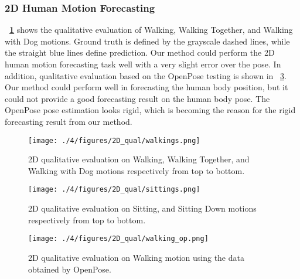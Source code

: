 \subsubsection{2D Human Motion Forecasting}\label{4:qual_2D}
\textbf{\figurename~\ref{fig:4_2d_long_walkings}} shows the qualitative evaluation of Walking, Walking Together, and Walking with Dog motions. Ground truth is defined by the grayscale dashed lines, while the straight blue lines define prediction. Our method could perform the 2D human motion forecasting task well with a very slight error over the pose. In addition, qualitative evaluation based on the OpenPose testing is shown in \figurename~\ref{fig:4_2d_long_walking_op}. Our method could perform well in forecasting the human body position, but it could not provide a good forecasting result on the human body pose. The OpenPose pose estimation looks rigid, which is becoming the reason for the rigid forecasting result from our method.
\begin{figure}[!t]
     \centering
     \texttt{[image: ./4/figures/2D\_qual/walkings.png]}
     \caption{2D qualitative evaluation on Walking, Walking Together, and Walking with Dog motions respectively from top to bottom.}
     \label{fig:4_2d_long_walkings}
\end{figure}
\begin{figure}[!t]
     \centering
     \texttt{[image: ./4/figures/2D\_qual/sittings.png]}
     \caption{2D qualitative evaluation on Sitting, and Sitting Down motions respectively from top to bottom.}
     \label{fig:4_2d_long_sittings}
\end{figure}
\begin{figure}[!t]
     \centering
     \texttt{[image: ./4/figures/2D\_qual/walking\_op.png]}
     \caption{2D qualitative evaluation on Walking motion using the data obtained by OpenPose.}
     \label{fig:4_2d_long_walking_op}
\end{figure}


